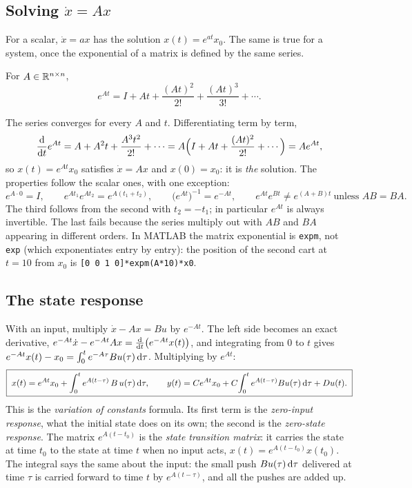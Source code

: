 \documentclass[11pt]{article}
\begin{document}
\subsection{Solving \texorpdfstring{$\dot x=Ax$}{xdot = Ax}}
For a scalar, $\dot x=ax$ has the solution $x(t)=e^{at}x_0$. The same is true for
a system, once the exponential of a matrix is defined by the same series.
\begin{definition}
For $A\in\mathbb{R}^{n\times n}$,
\[
   e^{At} = I + At + \frac{(At)^{2}}{2!} + \frac{(At)^{3}}{3!} + \cdots .
\]
\end{definition}
The series converges for every $A$ and $t$. Differentiating term by term,
\[
   \frac{\mathrm{d}}{\mathrm{d} t}e^{At} = A + A^{2}t + \frac{A^{3}t^{2}}{2!}+\cdots
   = A\Bigl(I+At+\frac{(At)^{2}}{2!}+\cdots\Bigr) = Ae^{At},
\]
so $x(t)=e^{At}x_0$ satisfies $\dot x=Ax$ and $x(0)=x_0$: it is \emph{the}
solution. The properties follow the scalar ones, with one exception:
\begin{equation}\label{eq:expmprops}
   e^{A\cdot0}=I,\qquad e^{At_1}e^{At_2}=e^{A(t_1+t_2)},\qquad
   \bigl(e^{At}\bigr)^{-1}=e^{-At},\qquad
   e^{At}e^{Bt}\neq e^{(A+B)t}\ \text{unless } AB=BA .
\end{equation}
The third follows from the second with $t_2=-t_1$; in particular $e^{At}$ is always
invertible. The last fails because the series multiply out with $AB$ and $BA$
appearing in different orders. In MATLAB the matrix exponential is
\verb|expm|, not \verb|exp| (which exponentiates entry by entry): the position of
the second cart at $t=10$ from $x_0$ is \verb|[0 0 1 0]*expm(A*10)*x0|.

\subsection{The state response}\label{sec:stateresponse}
With an input, multiply $\dot x-Ax=Bu$ by $e^{-At}$. The left side becomes an exact
derivative, $e^{-At}\dot x-e^{-At}Ax=\frac{\mathrm{d}}{\mathrm{d} t}\bigl(e^{-At}x(t)\bigr)$, and
integrating from $0$ to $t$ gives $e^{-At}x(t)-x_0=\int_0^{t}e^{-A\tau}Bu(\tau)\,\mathrm{d}\tau$.
Multiplying by $e^{At}$:
\begin{equation}\label{eq:voc}
   \boxed{\;x(t) = e^{At}x_0 + \int_{0}^{t} e^{A(t-\tau)}\,B\,u(\tau)\,\mathrm{d}\tau ,\qquad
   y(t) = Ce^{At}x_0 + C\!\int_{0}^{t} e^{A(t-\tau)}Bu(\tau)\,\mathrm{d}\tau + Du(t).\;}
\end{equation}
This is the \emph{variation of constants} formula. Its first term is the
\emph{zero-input response}, what the initial state does on its own; the second is
the \emph{zero-state response}. The matrix $e^{A(t-t_0)}$ is the \emph{state
transition matrix}: it carries the state at time $t_0$ to the state at time $t$
when no input acts, $x(t)=e^{A(t-t_0)}x(t_0)$. The integral says the same about
the input: the small push $Bu(\tau)\,\mathrm{d}\tau$ delivered at time $\tau$ is carried
forward to time $t$ by $e^{A(t-\tau)}$, and all the pushes are added up.
\end{document}
